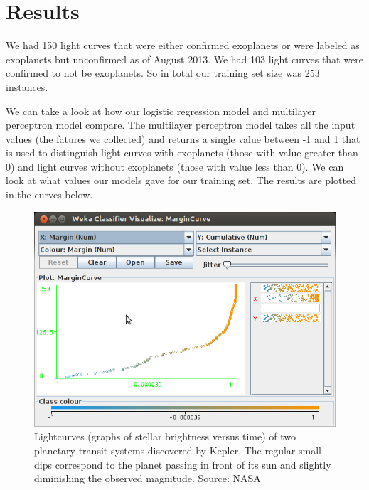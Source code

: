 \documentclass{amsart}
\begin{document}
\section{Results}
We had 150 light curves that were either confirmed exoplanets or were labeled as exoplanets but unconfirmed as of August 2013. We had 103 light curves that were confirmed to not be exoplanets. So in total our training set size was 253 instances. 





We can take a look at how our logistic regression model and multilayer perceptron model compare. The multilayer perceptron model takes all the input values (the fatures we collected) and returns a single value between -1 and 1 that is used to distinguish light curves with exoplanets (those with value greater than 0) and light curves without exoplanets (those with value less than 0). We can look at what values our models gave for our training set. The results are plotted in the curves below.
	\begin{figure}
	\centering
	\label{logistic}
	\includegraphics[width=6in]{logistic_regression}
	\caption{Lightcurves (graphs of stellar brightness versus time) of two planetary transit systems discovered by Kepler. The regular small dips correspond to the planet passing in front of its sun and slightly diminishing the observed magnitude. Source: NASA}%
	\end{figure}
\end{document}

